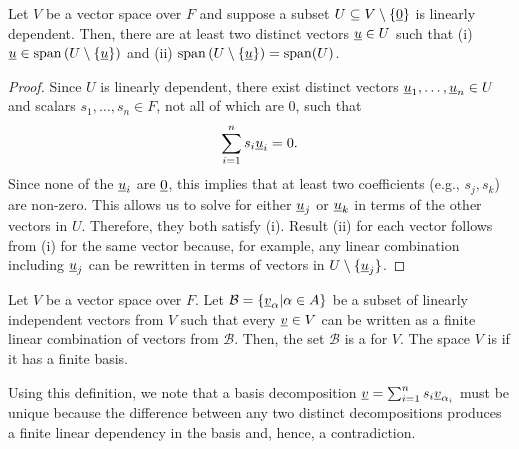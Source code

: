 \begin{lemma}
Let $V$ be a vector space over $F$ and suppose a subset $U \subseteq V \setminus \{ \underline{0} \}$ is linearly dependent.
Then, there are at least two distinct vectors $\underline{u} \in U$ such that (i) $\underline{u} \in \mathrm{span} \left(U \setminus  \{\underline{u} \}\right)$ and (ii) $\mathrm{span} \left( U \setminus \{\underline{u} \}\right) = \mathrm{span}(U)$.
\end{lemma}
\begin{proof}
Since $U$ is linearly dependent, there exist distinct vectors $\underline{u}_1, \ldots, \underline{u}_n \in U$ and scalars $s_1, \ldots, s_n \in F$, not all of which are $0$, such that
\begin{equation*}
\sum_{i=1}^n s_i \underline{u}_i = 0.
\end{equation*}
Since none of the $\underline{u}_i$ are $\underline{0}$, this implies that at least two coefficients (e.g., $s_j,s_k$) are non-zero.
This allows us to solve for either $\underline{u}_j$ or $\underline{u}_k$ in terms of the other vectors in $U$.
Therefore, they both satisfy (i).
Result (ii) for each vector follows from (i) for the same vector because, for example, any linear combination including $\underline{u}_j$ can be rewritten in terms of vectors in $U \setminus  \{\underline{u}_j \}$.
\end{proof}

\fi

\begin{definition}
Let $V$ be a vector space over $F$.
Let $\mathcal{B} = \left\{ \underline{v}_{\alpha} | \alpha \in A \right\}$ be a subset of linearly independent vectors from $V$ such that every $\underline{v} \in V$ can be written as a finite linear combination of vectors from $\mathcal{B}$.
Then, the set $\mathcal{B}$ is a  for $V$.
The space $V$ is  if it has a finite basis.
\end{definition}

Using this definition, we note that a basis decomposition $\underline{v} = \sum_{i=1}^n s_i \underline{v}_{\alpha_i}$ must be unique because the difference between any two distinct decompositions produces a finite linear dependency in the basis and, hence, a contradiction.

